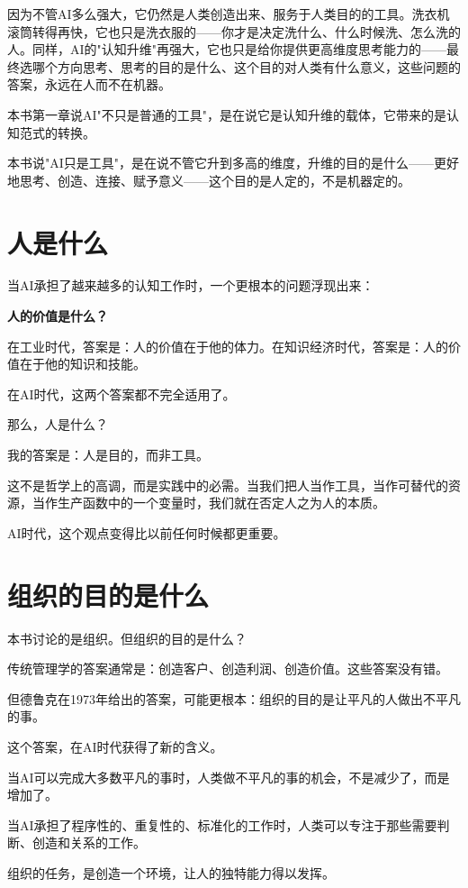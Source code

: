 因为不管AI多么强大，它仍然是人类创造出来、服务于人类目的的工具。洗衣机滚筒转得再快，它也只是洗衣服的——你才是决定洗什么、什么时候洗、怎么洗的人。同样，AI的"认知升维"再强大，它也只是给你提供更高维度思考能力的——最终选哪个方向思考、思考的目的是什么、这个目的对人类有什么意义，这些问题的答案，永远在人而不在机器。

本书第一章说AI"不只是普通的工具"，是在说它是认知升维的载体，它带来的是认知范式的转换。

本书说"AI只是工具"，是在说不管它升到多高的维度，升维的目的是什么——更好地思考、创造、连接、赋予意义——这个目的是人定的，不是机器定的。

\section{人是什么}


当AI承担了越来越多的认知工作时，一个更根本的问题浮现出来：

\textbf{人的价值是什么？}

在工业时代，答案是：人的价值在于他的体力。在知识经济时代，答案是：人的价值在于他的知识和技能。

在AI时代，这两个答案都不完全适用了。

那么，人是什么？

我的答案是：人是目的，而非工具。

这不是哲学上的高调，而是实践中的必需。当我们把人当作工具，当作可替代的资源，当作生产函数中的一个变量时，我们就在否定人之为人的本质。

AI时代，这个观点变得比以前任何时候都更重要。

\section{组织的目的是什么}


本书讨论的是组织。但组织的目的是什么？

传统管理学的答案通常是：创造客户、创造利润、创造价值。这些答案没有错。

但德鲁克在1973年给出的答案，可能更根本：组织的目的是让平凡的人做出不平凡的事。

这个答案，在AI时代获得了新的含义。

当AI可以完成大多数平凡的事时，人类做不平凡的事的机会，不是减少了，而是增加了。

当AI承担了程序性的、重复性的、标准化的工作时，人类可以专注于那些需要判断、创造和关系的工作。

组织的任务，是创造一个环境，让人的独特能力得以发挥。

